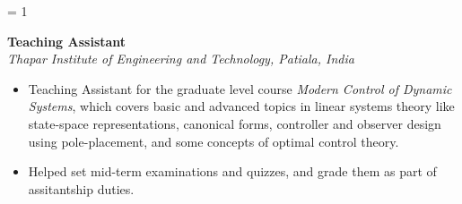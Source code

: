 \ifnum\teach = 1
	\vspace{0.1 in}
	
	\large{\textbf{Teaching Assistant}}
	\hfill
	\thapardate\\
	\emph{\large{Thapar Institute of Engineering and Technology, Patiala, India}}
	\begin{itemize}
		\item Teaching Assistant for the graduate level course \emph{Modern Control of Dynamic Systems}, which covers basic and advanced topics in linear systems theory like state-space representations, canonical forms, controller and observer design using pole-placement, and some concepts of optimal control theory.
		\item Helped set mid-term examinations and quizzes, and grade them as part of assitantship duties.
	\end{itemize}
\fi





